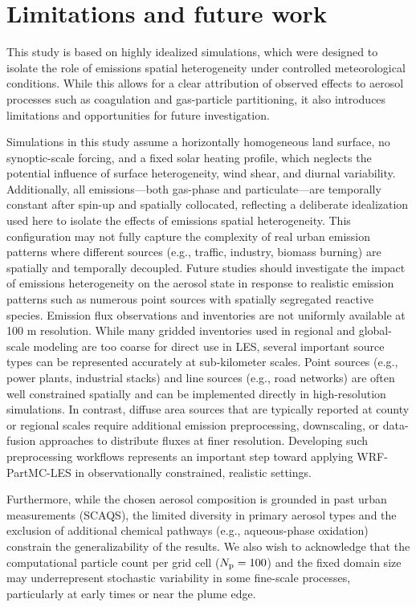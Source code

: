\documentclass[acp]{copernicus}
\begin{document}
\section{Limitations and future work}\label{sec:limitations}
This study is based on highly idealized simulations,
which were designed to isolate the role of emissions spatial
heterogeneity under controlled meteorological conditions. While this
allows for a clear attribution of observed effects to aerosol
processes such as coagulation and gas-particle partitioning, it also
introduces limitations and opportunities for future investigation.

Simulations in this study assume a horizontally homogeneous land
surface, no synoptic-scale forcing, and a fixed solar heating profile,
which neglects the potential influence of surface heterogeneity, wind
shear, and diurnal variability. Additionally, all emissions—both
gas-phase and particulate—are temporally constant after spin-up and
spatially collocated, reflecting a deliberate idealization used here
to isolate the effects of emissions spatial heterogeneity.  This
configuration may not fully capture the complexity of real urban
emission patterns where different sources (e.g., traffic, industry,
biomass burning) are spatially and temporally decoupled. Future
studies should investigate the impact of emissions heterogeneity on
the aerosol state in response to realistic emission patterns such as
numerous point sources with spatially segregated reactive
species. Emission flux observations and inventories are not uniformly available at 100 m resolution. While many gridded inventories used in regional and global-scale modeling are too coarse for direct use in LES, several important source types can be represented accurately at sub-kilometer scales. Point sources (e.g., power plants, industrial stacks) and line sources (e.g., road networks) are often well constrained spatially and can be implemented directly in high-resolution simulations. In contrast, diffuse area sources that are typically reported at county or regional scales require additional emission preprocessing, downscaling, or data-fusion approaches to distribute fluxes at finer resolution. Developing such preprocessing workflows represents an important step toward applying WRF-PartMC-LES in observationally constrained, realistic settings.



Furthermore, while the chosen aerosol composition is
grounded in past urban measurements (SCAQS), the limited diversity
in primary aerosol types and the exclusion of additional chemical
pathways (e.g., aqueous-phase oxidation) constrain the
generalizability of the results. We also wish to acknowledge that the computational particle
count per grid cell ($N_{\rm p} = 100$) and the fixed domain size
may underrepresent stochastic variability in some fine-scale
processes, particularly at early times or near the plume edge. 
\end{document}
